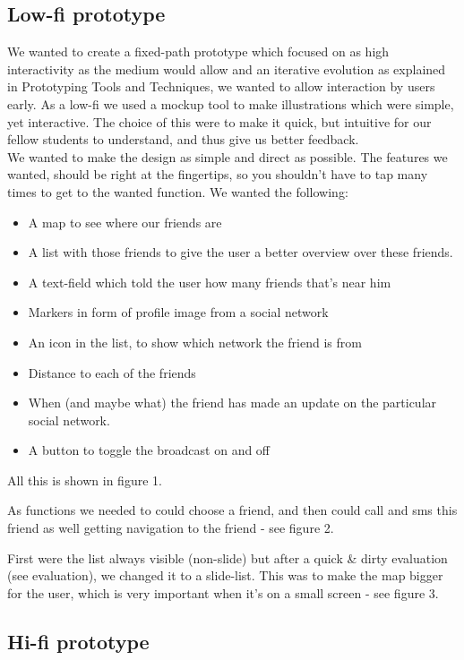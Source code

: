 \documentclass[runningheads,a4paper]{llncs}
\begin{document}
\subsection{Low-fi prototype}
We wanted to create a fixed-path prototype which focused on as high interactivity as the medium would allow and an iterative evolution as explained in Prototyping Tools and Techniques\cite{prototyping}, we wanted to allow interaction by users early. As a low-fi we used a mockup tool\cite{ninja} to make illustrations which were simple, yet interactive. The choice of this were to make it quick, but intuitive for our fellow students to understand, and thus give us better feedback. \\

We wanted to make the design as simple and direct as possible. The features we wanted, should be right at the fingertips, so you shouldn’t have to tap many times to get to the wanted function. 
We wanted the following: 
\begin{itemize}
  	\item A map to see where our friends are 
	\item A list with those friends to give the user a better overview over these friends. 
	\item A text-field which told the user how many friends that’s near him
	\item Markers in form of profile image from a social network
	\item An icon in the list, to show which network the friend is from
	\item Distance to each of the friends
	\item When (and maybe what) the friend has made an update on the particular social network.
	\item A button to toggle the broadcast on and off\\ 
\end{itemize}

All this is shown in figure 1. 

As functions we needed to could choose a friend, and then could call and sms this friend as well getting navigation to the friend - see figure 2. 

First were the list always visible (non-slide) but after a quick \& dirty evaluation (see evaluation), we changed it to a slide-list. This was to make the map bigger for the user, which is very important when it’s on a small screen - see figure 3. 

\subsection{Hi-fi prototype}
\end{document}
